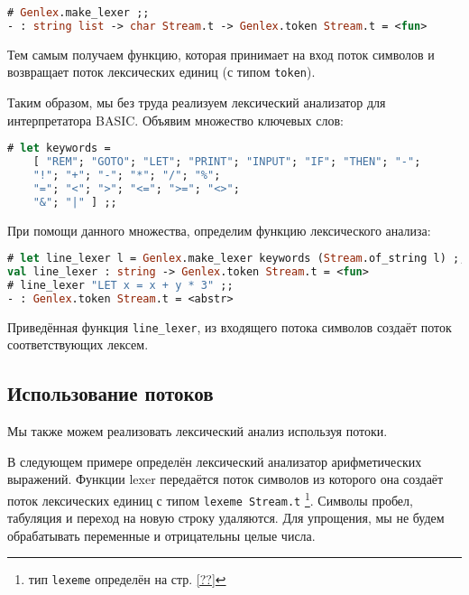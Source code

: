 \begin{lstlisting}[language=Caml]
# Genlex.make_lexer ;;
- : string list -> char Stream.t -> Genlex.token Stream.t = <fun>
\end{lstlisting}

Тем самым получаем функцию, которая принимает на вход поток символов и
возвращает поток лексических единиц (с типом \texttt{token}).

Таким образом, мы без труда реализуем лексический анализатор для интерпретатора
BASIC. Объявим множество ключевых слов:

\begin{lstlisting}[language=Caml]
# let keywords =
    [ "REM"; "GOTO"; "LET"; "PRINT"; "INPUT"; "IF"; "THEN"; "-";
    "!"; "+"; "-"; "*"; "/"; "%";
    "="; "<"; ">"; "<="; ">="; "<>";
    "&"; "|" ] ;;
\end{lstlisting}

При помощи данного множества, определим функцию лексического анализа:

\begin{lstlisting}[language=Caml]
# let line_lexer l = Genlex.make_lexer keywords (Stream.of_string l) ;;
val line_lexer : string -> Genlex.token Stream.t = <fun>
# line_lexer "LET x = x + y * 3" ;;
- : Genlex.token Stream.t = <abstr>
\end{lstlisting}

Приведённая функция \texttt{line\_lexer}, из входящего потока символов создаёт
поток соответствующих лексем.

\subsection{Использование потоков}

Мы также можем реализовать лексический анализ  используя потоки.

В следующем примере определён лексический анализатор арифметических выражений.
Функции lexer передаётся поток символов из которого она создаёт поток
лексических единиц с типом \texttt{lexeme Stream.t} \footnote{тип
\texttt{lexeme} определён на стр. \ref{??}}. Символы пробел, табуляция и
переход на новую строку удаляются. Для упрощения, мы не будем обрабатывать
переменные и отрицательны целые числа.

